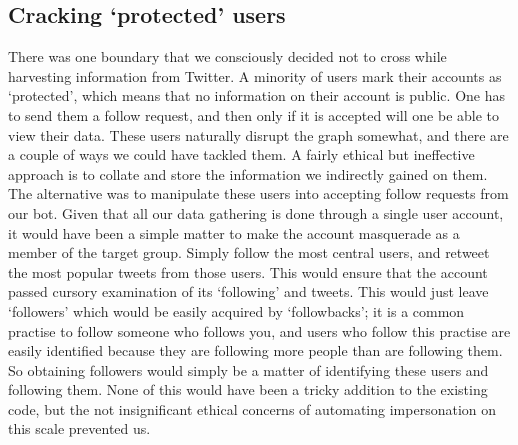 \subsection{Cracking `protected' users}
There was one boundary that we consciously decided not to cross while harvesting information from Twitter. A minority of users mark their accounts as `protected', which means that no information on their account is public. One has to send them a follow request, and then only if it is accepted will one be able to view their data. These users naturally disrupt the graph somewhat, and there are a couple of ways we could have tackled them. A fairly ethical but ineffective approach is to collate and store the information we indirectly gained on them. The alternative was to manipulate these users into accepting follow requests from our bot. Given that all our data gathering is done through a single user account, it would have been a simple matter to make the account masquerade as a member of the target group. Simply follow the most central users, and retweet the most popular tweets from those users. This would ensure that the account passed cursory examination of its `following' and tweets. This would just leave `followers' which would be easily acquired by `followbacks'; it is a common practise to follow someone who follows you, and users who follow this  practise are easily identified because they are following more people than are following them. So obtaining followers would simply be a matter of identifying these users and following them. None of this would have been a tricky addition to the existing code, but the not insignificant ethical concerns of automating impersonation on this scale prevented us.






